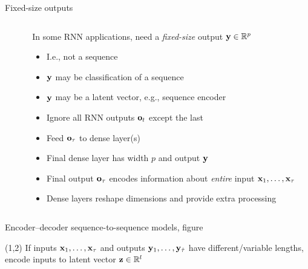 \begin{frame}{Fixed-size outputs}
    \begin{columns}
        \begin{column}{0.37\textwidth}
        \end{column}
        \begin{column}{0.63\textwidth}
            In some RNN applications, need a \emph{fixed-size} output $\mathbf{y} \in \mathbb{R}^p$
            \begin{itemize}
                \item<+-> I.e., not a sequence
                \item $\mathbf{y}$ may be classification of a sequence
                \item $\mathbf{y}$ may be a latent vector, e.g., sequence encoder
            \end{itemize}
            \begin{itemize}[<.->]
                \item Ignore all RNN outputs $\mathbf{o}_t$ except the last
                \item Feed $\mathbf{o}_\tau$ to dense layer(s)
                \item Final dense layer has width $p$ and output $\mathbf{y}$
            \end{itemize}
            \begin{itemize}[<.->]
                \item Final output $\mathbf{o}_\tau$ encodes information about \emph{entire} input $\mathbf{x}_1, \ldots, \mathbf{x}_\tau$
                \item Dense layers reshape dimensions and provide extra processing
            \end{itemize}
        \end{column}
    \end{columns}
\end{frame}

\begin{frame}{Encoder--decoder sequence-to-sequence models, figure}
    \vspace{5mm}
    
    \vspace{-2.5mm}

    \begin{textblock}{9.5}(1,2)
        If inputs $\mathbf{x}_1, \dots, \mathbf{x}_\tau$ and outputs $\mathbf{y}_1, \dots, \mathbf{y}_{\hat{\tau}}$ have different/variable lengths, \alert{encode} inputs to latent vector $\mathbf{z} \in \mathbb{R}^l$
    \end{textblock}
\end{frame}

